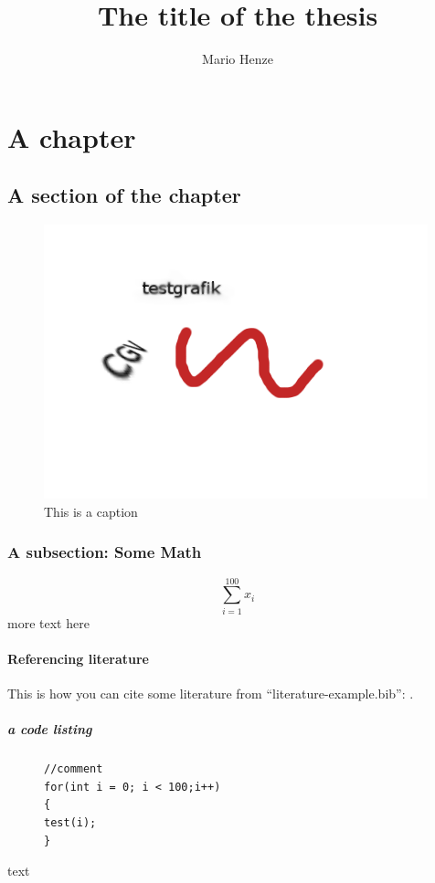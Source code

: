 \documentclass[hyperref, beleg, german]{cgvpub}
\author{Mario Henze}
\title{The title of the thesis}
\begin{document}
\chapter{A chapter}
\section{A section of the chapter}
\begin{figure}[htbp]
	\centering
		\includegraphics{test.png}
	\caption{This is a caption}
	\label{fig:label-of-fig}
\end{figure}


\subsection{A subsection: Some Math}

\[
\sum_{i=1}^{100}x_i
\]
more text here
\subsubsection{Referencing literature}
This is how you can cite some literature from "`literature-example.bib"': \cite{kochbuch}.
\paragraph{a code listing}


\begin{figure}[htbp]
\begin{lstlisting}[frame=trbl]
//comment
for(int i = 0; i < 100;i++)
{
test(i);
}
\end{lstlisting}
\end{figure}

text

\cite*{}
\end{document}
